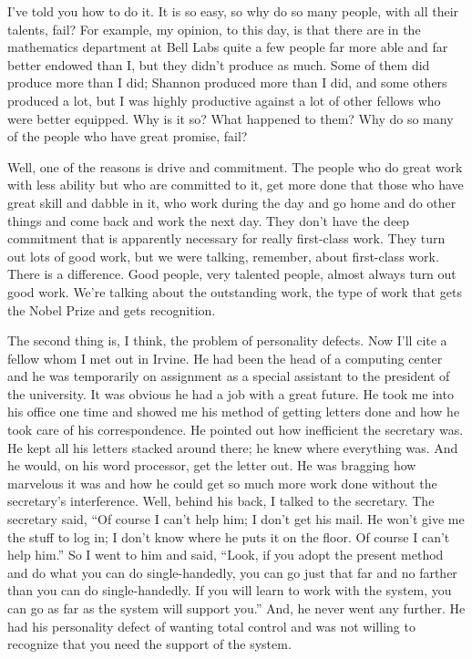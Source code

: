 \documentclass{article}
\begin{document}
I've told you how to do it. It is so easy, so why do so many people, with all their talents, fail? For example, my opinion, to this day, is that there are in the mathematics department at Bell Labs quite a few people far more able and far better endowed than I, but they didn't produce as much. Some of them did produce more than I did; Shannon produced more than I did, and some others produced a lot, but I was highly productive against a lot of other fellows who were better equipped. Why is it so? What happened to them? Why do so many of the people who have great promise, fail?

Well, one of the reasons is drive and commitment. The people who do great work with less ability but who are committed to it, get more done that those who have great skill and dabble in it, who work during the day and go home and do other things and come back and work the next day. They don't have the deep commitment that is apparently necessary for really first-class work. They turn out lots of good work, but we were talking, remember, about first-class work. There is a difference. Good people, very talented people, almost always turn out good work. We're talking about the outstanding work, the type of work that gets the Nobel Prize and gets recognition.

The second thing is, I think, the problem of personality defects. Now I'll cite a fellow whom I met out in Irvine. He had been the head of a computing center and he was temporarily on assignment as a special assistant to the president of the university. It was obvious he had a job with a great future. He took me into his office one time and showed me his method of getting letters done and how he took care of his correspondence. He pointed out how inefficient the secretary was. He kept all his letters stacked around there; he knew where everything was. And he would, on his word processor, get the letter out. He was bragging how marvelous it was and how he could get so much more work done without the secretary's interference. Well, behind his back, I talked to the secretary. The secretary said, ``Of course I can't help him; I don't get his mail. He won't give me the stuff to log in; I don't know where he puts it on the floor. Of course I can't help him.'' So I went to him and said, ``Look, if you adopt the present method and do what you can do single-handedly, you can go just that far and no farther than you can do single-handedly. If you will learn to work with the system, you can go as far as the system will support you.'' And, he never went any further. He had his personality defect of wanting total control and was not willing to recognize that you need the support of the system.
\end{document}
